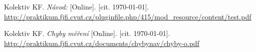 
\begin{thebibliography}{9}
 Kolektiv KF. \emph{Návod: \Title} [Online]. [cit. \today]. \newline \url{http://praktikum.fjfi.cvut.cz/pluginfile.php/415/mod\_resource/content/test.pdf}

 Kolektiv KF. \emph{Chyby měření} [Online]. [cit. \today]. \newline \url{http://praktikum.fjfi.cvut.cz/documents/chybynav/chyby-o.pdf}

\end{thebibliography}
